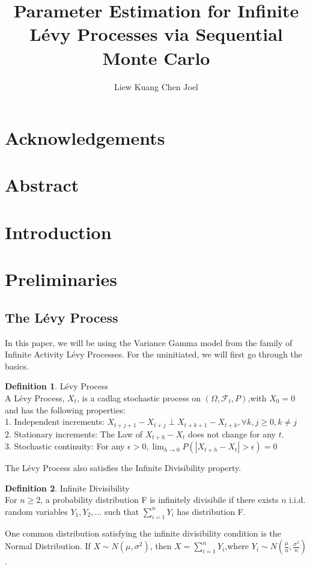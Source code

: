 \documentclass[11pt]{article}
\title{Parameter Estimation for Infinite L\'{e}vy Processes via Sequential Monte Carlo}
\author{Liew Kuang Chen Joel}
\theoremstyle{definition}
\newtheorem{definition}{Definition}[section]
\begin{document}
\maketitle
\newpage 
\section*{Acknowledgements}
\newpage
\section*{Abstract}
\newpage

\tableofcontents
\newpage

\section{Introduction}

\section{Preliminaries}

\subsection{The L\'{e}vy Process}
In this paper, we will be using the Variance Gamma model from the family of Infinite Activity L\'{e}vy Processes. For the uninitiated, we will first go through the basics.
\theoremstyle{definition}
\begin{definition}{L\'{e}vy Process}\\
A L\'{e}vy Process, $X_{t}$, is a cadlag stochastic process on $(\Omega,\mathcal{F}_{t},P)$,with $X_{0}=0$ and has the following properties:\\
1. Independent increments: $X_{t+j+1} - X_{t+j} \perp X_{t+k+1} - X_{t+k}, \forall k,j \ge 0 , k \neq j$\\
2. Stationary increments: The Law of $X_{t+h} - X_{t}$ does not change for any $t$.\\
3. Stochastic continuity: For any $\epsilon>0, \lim_{h\rightarrow 0} P(|X_{t+h}-X_{t}|>\epsilon) = 0$
\end{definition}
\justify The L\'{e}vy Process also satisfies the Infinite Divisibility property.
\begin{definition}{Infinite Divisibility} \\
For $n\ge 2$, a probability distribution F is infinitely divisibile if there exists $n$ i.i.d. random variables $Y_{1},Y_{2},...$ such that $\sum_{i=1}^{n} Y_{i}$ has distribution F.
\end{definition}
\justify One common distribution satisfying the infinite divisibility condition is the Normal Distribution. If $X \sim N(\mu,\sigma^{2})$, then $X = \sum_{i=1}^{n} Y_{i}$,where $Y_{i} \sim N(\frac{\mu}{n},\frac{\sigma^{2}}{n})$.
\end{document}
